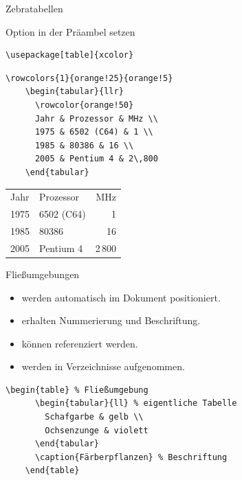\begin{Frame}[fragile]{Zebratabellen}
  \begin{Block}{Option in der Präambel setzen}
    \begin{lstlisting}[gobble=6,style=block]
      \usepackage[table]{xcolor}
    \end{lstlisting}
  \end{Block}

  \begin{lstlisting}[gobble=4]
    \rowcolors{1}{orange!25}{orange!5}
    \begin{tabular}{llr}
      \rowcolor{orange!50}
      Jahr & Prozessor & MHz \\
      1975 & 6502 (C64) & 1 \\
      1985 & 80386 & 16 \\
      2005 & Pentium 4 & 2\,800
    \end{tabular}
  \end{lstlisting}

  \begin{center}  
    \begin{tabular}{llr}
      \rowcolor{orange!50}
      Jahr & Prozessor & MHz \\
      1975 & 6502 (C64) & 1 \\
      1985 & 80386 & 16 \\
      2005 & Pentium 4 & 2\,800
    \end{tabular}
  \end{center}
\end{Frame}

\begin{frame}[fragile]{Fließumgebungen}
  \begin{itemize}
    \item werden automatisch im Dokument positioniert.
    \item erhalten Nummerierung und Beschriftung.
    \item können referenziert werden.
    \item werden in Verzeichnisse aufgenommen.
  \end{itemize}

  \begin{lstlisting}[gobble=4]
    \begin{table} % Fließumgebung
      \begin{tabular}{ll} % eigentliche Tabelle
        Schafgarbe & gelb \\
        Ochsenzunge & violett
      \end{tabular}
      \caption{Färberpflanzen} % Beschriftung
    \end{table}
  \end{lstlisting}
\end{frame}

